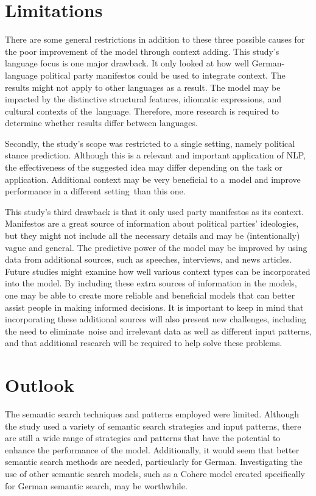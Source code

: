 \section{Limitations}

There are some general restrictions in addition to these three possible causes for the poor improvement of the model through context adding. This study's language focus is one major drawback. It only looked at how well German-language political party manifestos could be used to integrate context. The results might not apply to other languages as a result. The model may be impacted by the distinctive structural features, idiomatic expressions, and cultural contexts of the language. Therefore, more research is required to determine whether results differ between languages.

Secondly, the study's scope was restricted to a single setting, namely political stance prediction. Although this is a relevant and important application of NLP, the effectiveness of the suggested idea may differ depending on the task or application. Additional context may be very beneficial to a model and improve performance in a different setting than this one.

This study's third drawback is that it only used party manifestos as its context. Manifestos are a great source of information about political parties' ideologies, but they might not include all the necessary details and may be (intentionally) vague and general. The predictive power of the model may be improved by using data from additional sources, such as speeches, interviews, and news articles. Future studies might examine how well various context types can be incorporated into the model. By including these extra sources of information in the models, one may be able to create more reliable and beneficial models that can better assist people in making informed decisions. It is important to keep in mind that incorporating these additional sources will also present new challenges, including the need to eliminate noise and irrelevant data as well as different input patterns, and that additional research will be required to help solve these problems.

\section{Outlook}

The semantic search techniques and patterns employed were limited. Although the study used a variety of semantic search strategies and input patterns, there are still a wide range of strategies and patterns that have the potential to enhance the performance of the model. Additionally, it would seem that better semantic search methods are needed, particularly for German. Investigating the use of other semantic search models, such as a Cohere model \citep{cohere} created specifically for German semantic search, may be worthwhile.

